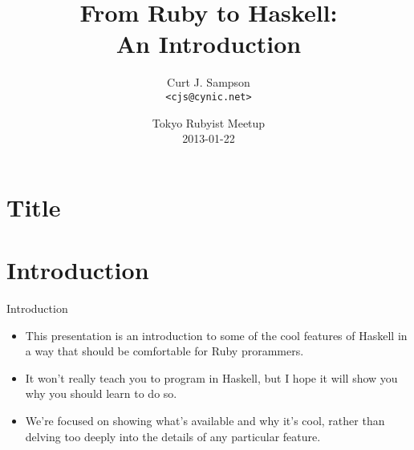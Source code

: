 \documentclass[xcolor=dvipsnames]{beamer}          %
\title[From Ruby to Haskell]{From Ruby to Haskell:\\An Introduction}
\author{Curt J. Sampson \\ \texttt{<cjs@cynic.net>}}
\date[TRM 2013-01-22]{Tokyo Rubyist Meetup \\ 2013-01-22}
\begin{document}
\section{Title}

\begin{frame}
  \titlepage
\end{frame}


\section{Introduction}

\begin{frame}[fragile]{Introduction}
\begin{itemize}
    \item This presentation is an introduction to some of the cool
        features of Haskell in a way that should be comfortable
        for Ruby prorammers.
    \item It won't really teach you to program in Haskell, but I hope
        it will show you why you should learn to do so.
    \item We're focused on showing what's available and why it's
        cool, rather than delving too deeply into the details of any
        particular feature.
\end{itemize}
\end{frame}
\end{document}
